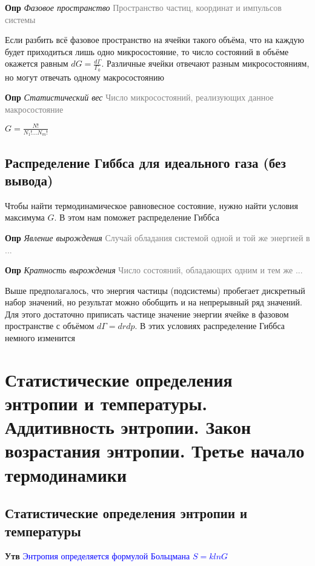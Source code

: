 \documentclass[a4paper, 14pt]{article}
\begin{document}
    \textbf{Опр} \textit{Фазовое пространство} \textcolor{gray}{Пространство частиц, координат и импульсов системы}

    Если разбить всё фазовое пространство на ячейки такого объёма, что на каждую будет приходиться лишь одно
    микросостояние, то число состояний в объёме окажется равным $dG = \frac{d\Gamma}{\Gamma_0}$.
    Различные ячейки отвечают разным микросостояниям, но могут отвечать одному макросостоянию

    \textbf{Опр} \textit{Статистический вес} \textcolor{gray}{Число микросостояний, реализующих данное макросостояние}

    $G = \frac{N!}{N_1! \dots N_m!}$

    \subsection{Распределение Гиббса для идеального газа (без вывода)}

    Чтобы найти термодинамическое равновесное состояние, нужно найти условия максимума $G$.
    В этом нам поможет распределение Гиббса

    \textbf{Опр} \textit{Явление вырождения} \textcolor{gray}{Случай обладания системой одной и той же энергией в ...}

    \textbf{Опр} \textit{Кратность вырождения} \textcolor{gray}{Число состояний, обладающих одним и тем же ...}

    Выше предполагалось, что энергия частицы (подсистемы) пробегает дискретный набор значений, но результат можно
    обобщить и на непрерывный ряд значений.
    Для этого достаточно приписать частице значение энергии ячейке в фазовом пространстве с объёмом $d\Gamma = dr dp$.
    В этих условиях распределение Гиббса немного изменится

    \section{Статистические определения энтропии и температуры.
    Аддитивность энтропии.
    Закон возрастания энтропии.
    Третье начало термодинамики}

    \subsection{Статистические определения энтропии и температуры}

    \textbf{Утв} \textcolor{blue}{Энтропия определяется формулой Больцмана $S = klnG$}
\end{document}
